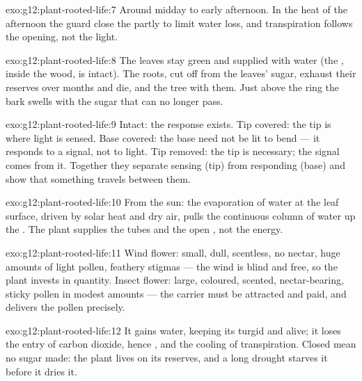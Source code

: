 \begin{solution}{exo:g12:plant-rooted-life:7}
Around midday to early afternoon. In the heat of the afternoon the
guard  close the  partly to limit water loss, and
transpiration follows the opening, not the light.
\end{solution}

\begin{solution}{exo:g12:plant-rooted-life:8}
The leaves stay green and supplied with water (the , inside the
wood, is intact). The roots, cut off from the leaves' sugar, exhaust
their reserves over months and die, and the tree with them. Just above
the ring the bark swells with the sugar that can no longer pass.
\end{solution}

\begin{solution}{exo:g12:plant-rooted-life:9}
Intact: the response exists. Tip covered: the tip is where light is
sensed. Base covered: the base need not be lit to bend --- it responds
to a signal, not to light. Tip removed: the tip is necessary; the
signal comes from it. Together they separate sensing (tip) from
responding (base) and show that something travels between them.
\end{solution}

\begin{solution}{exo:g12:plant-rooted-life:10}
From the sun: the evaporation of water at the leaf surface, driven by
solar heat and dry air, pulls the continuous column of water up the
. The plant supplies the tubes and the open , not the
energy.
\end{solution}

\begin{solution}{exo:g12:plant-rooted-life:11}
Wind flower: small, dull, scentless, no nectar, huge amounts of light
pollen, feathery stigmas --- the wind is blind and free, so the plant
invests in quantity. Insect flower: large, coloured, scented,
nectar-bearing, sticky pollen in modest amounts --- the carrier must be
attracted and paid, and delivers the pollen precisely.
\end{solution}

\begin{solution}{exo:g12:plant-rooted-life:12}
It gains water, keeping its  turgid and alive; it loses the
entry of carbon dioxide, hence , and the cooling of
transpiration. Closed  mean no sugar made: the plant lives on
its reserves, and a long drought starves it before it dries it.
\end{solution}

